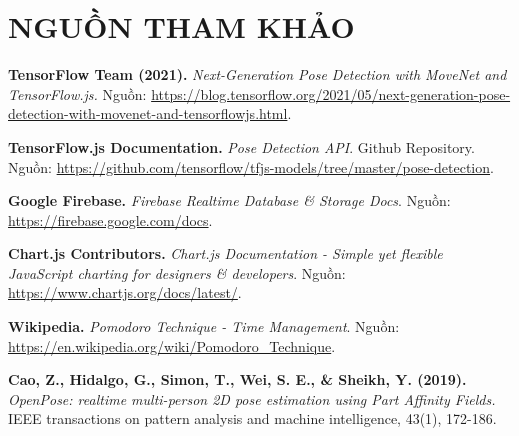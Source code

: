 \documentclass[12pt,a4paper]{report}
\begin{document}
\newpage
\chapter*{NGUỒN THAM KHẢO}

\begin{enumerate}[label={[\arabic*]}]
    \item \textbf{TensorFlow Team (2021).} \textit{Next-Generation Pose Detection with MoveNet and TensorFlow.js.} Nguồn: \url{https://blog.tensorflow.org/2021/05/next-generation-pose-detection-with-movenet-and-tensorflowjs.html}.
    
    \item \textbf{TensorFlow.js Documentation.} \textit{Pose Detection API}. Github Repository. Nguồn: \url{https://github.com/tensorflow/tfjs-models/tree/master/pose-detection}.
    
    \item \textbf{Google Firebase.} \textit{Firebase Realtime Database \& Storage Docs}. Nguồn: \url{https://firebase.google.com/docs}.
    
    \item \textbf{Chart.js Contributors.} \textit{Chart.js Documentation - Simple yet flexible JavaScript charting for designers & developers}. Nguồn: \url{https://www.chartjs.org/docs/latest/}.
    
    \item \textbf{Wikipedia.} \textit{Pomodoro Technique - Time Management}. Nguồn: \url{https://en.wikipedia.org/wiki/Pomodoro_Technique}.
    
    \item \textbf{Cao, Z., Hidalgo, G., Simon, T., Wei, S. E., \& Sheikh, Y. (2019).} \textit{OpenPose: realtime multi-person 2D pose estimation using Part Affinity Fields.} IEEE transactions on pattern analysis and machine intelligence, 43(1), 172-186.
\end{enumerate}
\end{document}
